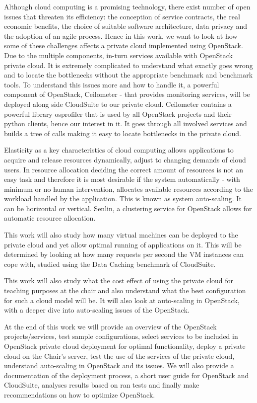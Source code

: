 Although cloud computing is a promising technology, there exist number of open issues that threaten its efficiency: the conception of service contracts, the real economic benefits, the choice of suitable software architecture, data privacy and the adoption of an agile process. Hence in this work, we want to look at how some of these challenges affects a private cloud implemented using OpenStack. Due to the multiple components, in-turn services available with OpenStack private cloud. It is extremely complicated to understand what exactly goes wrong and to locate the bottlenecks without the appropriate benchmark and benchmark tools. To understand this issues more and how to handle it, a powerful component of OpenStack, Ceilometer - that provides monitoring services, will be deployed along side CloudSuite to our private cloud. Ceilometer contains a powerful library osprofiler that is used by all OpenStack projects and their python clients, hence our interest in it. It goes through all involved services and builds a tree of calls making it easy to locate bottlenecks in the private cloud.

Elasticity as a key characteristics of cloud computing allows applications to acquire and release resources dynamically, adjust to changing demands of cloud users. In resource allocation deciding the correct amount of resources is not an easy task and therefore it is most desirable if the system automatically - with minimum or no human intervention, allocates available resources according to the workload handled by the application. This is known as system auto-scaling. It can be horizontal or vertical. Senlin, a clustering service for OpenStack allows for automatic resource allocation.

This work will also study how many virtual machines can be deployed to the private cloud and yet allow optimal running of applications on it. This will be determined by looking at how many requests per second the VM instances can cope with, studied using the Data Caching benchmark of CloudSuite.

This work will also study what the cost effect of using the private cloud for teaching purposes at the chair and also understand what the best configuration for such a cloud model will be. It will also look at auto-scaling in OpenStack, with a deeper dive into auto-scaling issues of the OpenStack.

At the end of this work we will provide an overview of the OpenStack projects/services, test sample configurations, select services to be included in OpenStack private cloud deployment for optimal functionality, deploy a private cloud on the Chair's server, test the use of the services of the private cloud, understand auto-scaling in OpenStack and its issues. We will also provide a documentation of the deployment process, a short user guide for OpenStack and CloudSuite, analyses results based on ran tests and finally make recommendations on how to optimize OpenStack.

